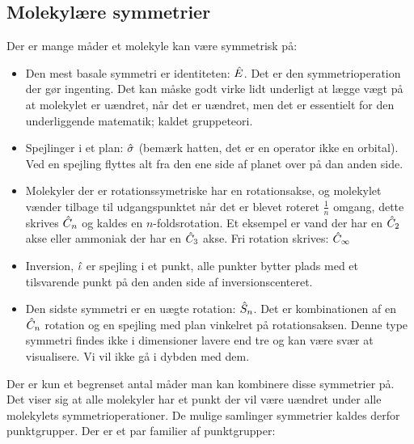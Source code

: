 \documentclass[../main.tex]{subfiles}
\begin{document}
\subsection{Molekylære symmetrier}
Der er mange måder et molekyle kan være symmetrisk på:
\begin{itemize}
    \item Den mest basale symmetri er identiteten: $\hat E$. Det er den symmetrioperation der gør ingenting. Det kan måske godt virke lidt underligt at lægge vægt på at molekylet er uændret, når det er uændret, men det er essentielt for den underliggende matematik; kaldet gruppeteori.
    \item Spejlinger i et plan: $\hat \sigma$ (bemærk hatten, det er en operator ikke en orbital). Ved en spejling flyttes alt fra den ene side af planet over på dan anden side. 
    \item Molekyler der er rotationssymetriske har en rotationsakse, og molekylet vænder tilbage til udgangspunktet når det er blevet roteret $\frac{1}{n}$ omgang, dette skrives $\hat C_n$ og kaldes en $n$-foldsrotation. Et eksempel er vand der har en $\hat C_2$ akse eller ammoniak der har en $\hat C_3$ akse. Fri rotation skrives: $\hat C_\infty$
    \item Inversion, $\hat \iota$ er spejling i et punkt, alle punkter bytter plads med et tilsvarende punkt på den anden side af inversionscenteret. 
    \item Den sidste symmetri er en uægte rotation: $\hat S_n$. Det er kombinationen af en $\hat C_n$ rotation og en spejling med plan vinkelret på rotationsaksen. Denne type symmetri findes ikke i dimensioner lavere end tre og kan være svær at visualisere. Vi vil ikke gå i dybden med dem.
\end{itemize}
Der er kun et begrenset antal måder man kan kombinere disse symmetrier på. Det viser sig at alle molekyler har et punkt der vil være uændret under alle molekylets symmetrioperationer. De mulige samlinger symmetrier kaldes derfor punktgrupper. Der er et par familier af punktgrupper:
\end{document}
